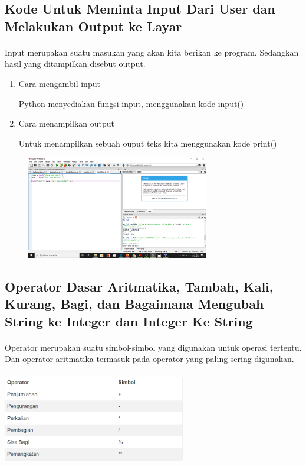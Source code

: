 \subsection{Kode Untuk Meminta Input Dari User dan Melakukan Output ke Layar}
\paragraph{} Input merupakan suatu masukan yang akan kita berikan ke program. Sedangkan hasil yang ditampilkan disebut output.
\begin{enumerate}
    \item Cara mengambil input
        \par Python menyediakan fungsi input, menggunakan kode input()
    \item Cara menampilkan output
        \par Untuk menampilkan sebuah ouput teks kita menggunakan kode print()
\end{enumerate}
\begin{figure}[h]
                 \centerline{\includegraphics[width=8cm]{gambar/inputoutput.png}}
\end{figure}


\subsection{Operator Dasar Aritmatika, Tambah, Kali, Kurang, Bagi, dan Bagaimana Mengubah String ke Integer dan Integer Ke String}
\paragraph{} Operator merupakan suatu simbol-simbol yang digunakan untuk operasi tertentu. Dan operator aritmatika termasuk pada operator yang paling sering digunakan. 
\paragraph{}
    \centerline{\includegraphics[width=8cm]{gambar/operatoraritmetika.PNG}}
